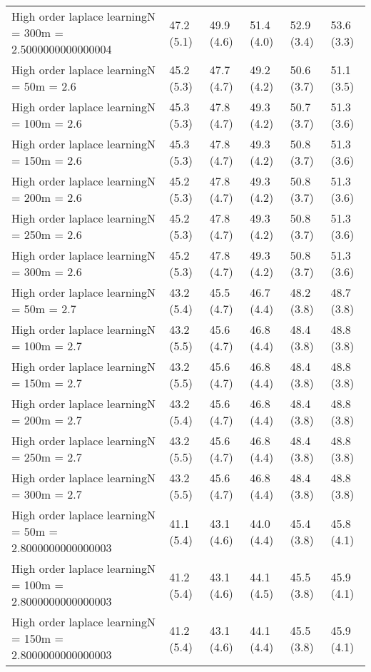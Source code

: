 \documentclass{article}
\begin{document}
\begin{table*}[t!]
\begin{center}
\begin{small}
\begin{sc}
\begin{tabular}{llllll}
High order laplace learningN = 300m = 2.5000000000000004&47.2 (5.1)      &49.9 (4.6)      &51.4 (4.0)      &52.9 (3.4)      &53.6 (3.3)      \\
High order laplace learningN = 50m = 2.6&45.2 (5.3)      &47.7 (4.7)      &49.2 (4.2)      &50.6 (3.7)      &51.1 (3.5)      \\
High order laplace learningN = 100m = 2.6&45.3 (5.3)      &47.8 (4.7)      &49.3 (4.2)      &50.7 (3.7)      &51.3 (3.6)      \\
High order laplace learningN = 150m = 2.6&45.3 (5.3)      &47.8 (4.7)      &49.3 (4.2)      &50.8 (3.7)      &51.3 (3.6)      \\
High order laplace learningN = 200m = 2.6&45.2 (5.3)      &47.8 (4.7)      &49.3 (4.2)      &50.8 (3.7)      &51.3 (3.6)      \\
High order laplace learningN = 250m = 2.6&45.2 (5.3)      &47.8 (4.7)      &49.3 (4.2)      &50.8 (3.7)      &51.3 (3.6)      \\
High order laplace learningN = 300m = 2.6&45.2 (5.3)      &47.8 (4.7)      &49.3 (4.2)      &50.8 (3.7)      &51.3 (3.6)      \\
High order laplace learningN = 50m = 2.7&43.2 (5.4)      &45.5 (4.7)      &46.7 (4.4)      &48.2 (3.8)      &48.7 (3.8)      \\
High order laplace learningN = 100m = 2.7&43.2 (5.5)      &45.6 (4.7)      &46.8 (4.4)      &48.4 (3.8)      &48.8 (3.8)      \\
High order laplace learningN = 150m = 2.7&43.2 (5.5)      &45.6 (4.7)      &46.8 (4.4)      &48.4 (3.8)      &48.8 (3.8)      \\
High order laplace learningN = 200m = 2.7&43.2 (5.4)      &45.6 (4.7)      &46.8 (4.4)      &48.4 (3.8)      &48.8 (3.8)      \\
High order laplace learningN = 250m = 2.7&43.2 (5.5)      &45.6 (4.7)      &46.8 (4.4)      &48.4 (3.8)      &48.8 (3.8)      \\
High order laplace learningN = 300m = 2.7&43.2 (5.5)      &45.6 (4.7)      &46.8 (4.4)      &48.4 (3.8)      &48.8 (3.8)      \\
High order laplace learningN = 50m = 2.8000000000000003&41.1 (5.4)      &43.1 (4.6)      &44.0 (4.4)      &45.4 (3.8)      &45.8 (4.1)      \\
High order laplace learningN = 100m = 2.8000000000000003&41.2 (5.4)      &43.1 (4.6)      &44.1 (4.5)      &45.5 (3.8)      &45.9 (4.1)      \\
High order laplace learningN = 150m = 2.8000000000000003&41.2 (5.4)      &43.1 (4.6)      &44.1 (4.4)      &45.5 (3.8)      &45.9 (4.1)      \\

\end{tabular}
\end{sc}
\end{small}
\end{center}
\end{table*}
\end{document}
